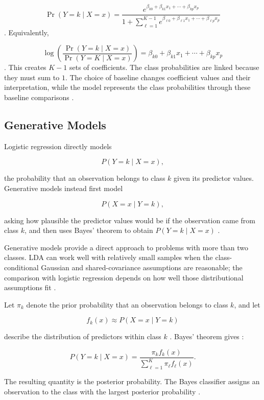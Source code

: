 \documentclass[11pt,letterpaper,reqno]{amsart}
\numberwithin{equation}{subsection}
\theoremstyle{definition}
\numberwithin{thm}{subsection}
\begin{document}
\[
\Pr(Y=k\mid X=x)
=
\frac{
e^{\beta_{k0}+\beta_{k1}x_1+\cdots+\beta_{kp}x_p}
}{
1+\sum_{\ell=1}^{K-1}
e^{\beta_{\ell0}+\beta_{\ell1}x_1+\cdots+\beta_{\ell p}x_p}
}
\]
\cite[Equation 4.10, pp. 144--145]{James:2023}.
Equivalently,

\[
\log\left(
\frac{\Pr(Y=k\mid X=x)}
{\Pr(Y=K\mid X=x)}
\right)
=
\beta_{k0}+\beta_{k1}x_1+\cdots+\beta_{kp}x_p
\]
\cite[Equation 4.12, p. 145]{James:2023}.
This creates $K-1$ sets of coefficients. The class probabilities are linked because they must sum to $1$. The choice of baseline changes coefficient values and their interpretation, while the model represents the class probabilities through these baseline comparisons \cite[Section 4.3.5, pp. 144--146]{James:2023}.

\subsection{Generative Models}

Logistic regression directly models

\[
P(Y=k\mid X=x),
\]

the probability that an observation belongs to class $k$ given its predictor values. Generative models instead first model

\[
P(X=x\mid Y=k),
\]

asking how plausible the predictor values would be if the observation came from class $k$, and then uses Bayes' theorem to obtain $P(Y=k\mid X=x)$ \cite[Section 4.4, p. 146]{James:2023}.

Generative models provide a direct approach to problems with more than two classes. LDA can work well with relatively small samples when the class-conditional Gaussian and shared-covariance assumptions are reasonable; the comparison with logistic regression depends on how well those distributional assumptions fit \cite[Section 4.4, p. 146-147]{James:2023}.

Let $\pi_k$ denote the prior probability that an observation belongs to class $k$, and let

\[
f_k(x)\approx P(X=x\mid Y=k)
\]

describe the distribution of predictors within class $k$ \cite[Section 4.4, p. 146]{James:2023}. Bayes' theorem gives \cite[Equation 4.15, p. 147]{James:2023}:

\[
P(Y=k\mid X=x)
=
\frac{\pi_k f_k(x)}
{\sum_{\ell=1}^{K}\pi_\ell f_\ell(x)}.
\]

The resulting quantity is the posterior probability. The Bayes classifier assigns an observation to the class with the largest posterior probability \cite[Section 4.4, pp. 147--148]{James:2023}.
\end{document}
